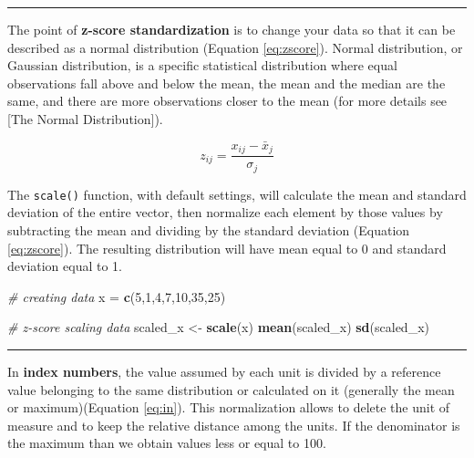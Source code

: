 \documentclass[
]{svmono}
\newenvironment{Shaded}{\begin{snugshade}}{\end{snugshade}}
\newcommand{\CommentTok}[1]{\textcolor[rgb]{0.56,0.35,0.01}{\textit{#1}}}
\newcommand{\DecValTok}[1]{\textcolor[rgb]{0.00,0.00,0.81}{#1}}
\newcommand{\FunctionTok}[1]{\textcolor[rgb]{0.13,0.29,0.53}{\textbf{#1}}}
\newcommand{\NormalTok}[1]{#1}
\newcommand{\OtherTok}[1]{\textcolor[rgb]{0.56,0.35,0.01}{#1}}
\begin{document}
\begin{center}\rule{0.5\linewidth}{0.5pt}\end{center}

The point of \textbf{z-score standardization} is to change your data so that
it can be described as a normal distribution (Equation \eqref{eq:zscore}). Normal distribution, or
Gaussian distribution, is a specific statistical distribution where
equal observations fall above and below the mean, the mean and the
median are the same, and there are more observations closer to the mean
(for more details see {[}The Normal Distribution{]}).

\begin{equation}
z_{ij}=\frac{x_{ij}-\bar x_j}{\sigma_j}
\label{eq:zscore}
\end{equation}

The \texttt{scale()} function, with default settings, will calculate the mean
and standard deviation of the entire vector, then normalize each element
by those values by subtracting the mean and dividing by the standard
deviation (Equation \eqref{eq:zscore}). The resulting distribution will have mean
equal to 0 and standard deviation equal to 1.

\begin{Shaded}
\begin{Highlighting}[]
\CommentTok{\# creating data}
\NormalTok{x }\OtherTok{=} \FunctionTok{c}\NormalTok{(}\DecValTok{5}\NormalTok{,}\DecValTok{1}\NormalTok{,}\DecValTok{4}\NormalTok{,}\DecValTok{7}\NormalTok{,}\DecValTok{10}\NormalTok{,}\DecValTok{35}\NormalTok{,}\DecValTok{25}\NormalTok{)}

\CommentTok{\# z{-}score scaling data}
\NormalTok{scaled\_x }\OtherTok{\textless{}{-}} \FunctionTok{scale}\NormalTok{(x)}
\FunctionTok{mean}\NormalTok{(scaled\_x)}
\FunctionTok{sd}\NormalTok{(scaled\_x)}
\end{Highlighting}
\end{Shaded}

\begin{center}\rule{0.5\linewidth}{0.5pt}\end{center}

In \textbf{index numbers}, the value assumed by each unit is divided by a
reference value belonging to the same distribution or calculated on it
(generally the mean or maximum)(Equation \eqref{eq:in}). This normalization allows
to delete the unit of measure and to keep the relative distance among
the units. If the denominator is the maximum than we obtain values less
or equal to 100.
\end{document}
